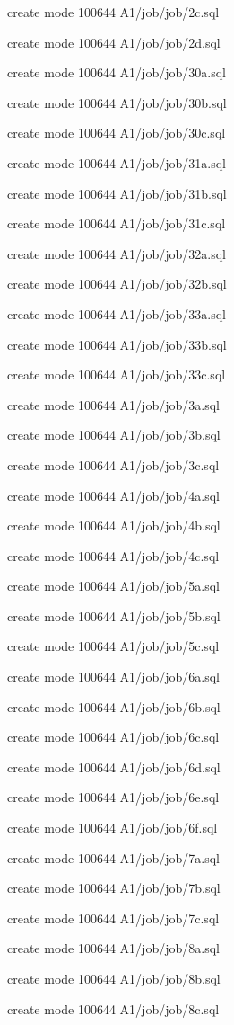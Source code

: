 \documentclass[11pt,a4paper]{article}
\begin{document}
{create mode 100644 A1/job/job/2c.sql

create mode 100644 A1/job/job/2d.sql

create mode 100644 A1/job/job/30a.sql

create mode 100644 A1/job/job/30b.sql

create mode 100644 A1/job/job/30c.sql

create mode 100644 A1/job/job/31a.sql

create mode 100644 A1/job/job/31b.sql

create mode 100644 A1/job/job/31c.sql

create mode 100644 A1/job/job/32a.sql

create mode 100644 A1/job/job/32b.sql

create mode 100644 A1/job/job/33a.sql

create mode 100644 A1/job/job/33b.sql

create mode 100644 A1/job/job/33c.sql

create mode 100644 A1/job/job/3a.sql

create mode 100644 A1/job/job/3b.sql

create mode 100644 A1/job/job/3c.sql

create mode 100644 A1/job/job/4a.sql


create mode 100644 A1/job/job/4b.sql

create mode 100644 A1/job/job/4c.sql

create mode 100644 A1/job/job/5a.sql

create mode 100644 A1/job/job/5b.sql

create mode 100644 A1/job/job/5c.sql

create mode 100644 A1/job/job/6a.sql

create mode 100644 A1/job/job/6b.sql

create mode 100644 A1/job/job/6c.sql

create mode 100644 A1/job/job/6d.sql

create mode 100644 A1/job/job/6e.sql

create mode 100644 A1/job/job/6f.sql

create mode 100644 A1/job/job/7a.sql

create mode 100644 A1/job/job/7b.sql

create mode 100644 A1/job/job/7c.sql

create mode 100644 A1/job/job/8a.sql

create mode 100644 A1/job/job/8b.sql

create mode 100644 A1/job/job/8c.sql

}
\end{document}

